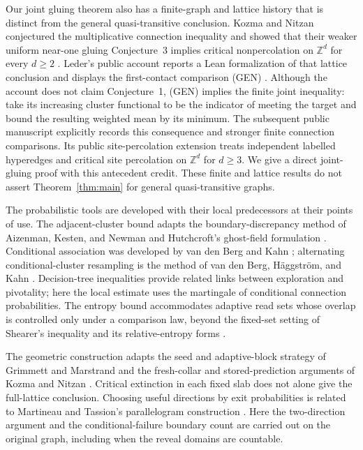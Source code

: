 \documentclass[11pt]{article}
\theoremstyle{definition}
\newcommand{\Z}{\mathbb Z}
\begin{document}
Our joint gluing theorem also has a finite-graph and lattice history
that is distinct from the general quasi-transitive conclusion.
Kozma and Nitzan conjectured the multiplicative connection inequality
\cite[Conjecture~1]{KozmaNitzan2024} and showed that their weaker
uniform near-one gluing Conjecture~3 implies critical nonpercolation
on $\Z^d$ for every $d\ge2$ \cite[Theorem~6]{KozmaNitzan2024}.
Leder's public account reports a Lean formalization of that lattice
conclusion and displays the first-contact comparison (GEN)
\cite[Section~3.4]{Leder2026}. Although the account does not claim
Conjecture~1, (GEN) implies the finite joint inequality: take its
increasing cluster functional to be the indicator of meeting the
target and bound the resulting weighted mean by its minimum.
The subsequent public manuscript \cite{ConnectionInequalities2026}
explicitly records this consequence and stronger finite connection
comparisons. Its public site-percolation extension
\cite{SiteCriticality2026} treats independent labelled hyperedges
and critical site percolation on $\Z^d$ for $d\ge3$. We give a direct
joint-gluing proof with this antecedent credit. These finite and
lattice results do not assert Theorem~\ref{thm:main} for general
quasi-transitive graphs.

The probabilistic tools are developed with their local predecessors
at their points of use. The adjacent-cluster bound adapts the
boundary-discrepancy method of Aizenman, Kesten, and Newman
\cite[Section~3]{AizenmanKestenNewman1987} and Hutchcroft's
ghost-field formulation \cite[Section~3]{Hutchcroft2020Locality}.
Conditional association was developed by van den Berg and Kahn
\cite{VanDenBergKahn2001}; alternating conditional-cluster resampling
is the method of van den Berg, H\"aggstr\"om, and Kahn
\cite{VanDenBergHaggstromKahn2006}. Decision-tree inequalities
\cite{OSSS2005,DuminilCopinRaoufiTassion2019} provide related links
between exploration and pivotality; here the local estimate uses
the martingale of conditional connection probabilities. The entropy
bound accommodates adaptive read sets whose overlap is controlled
only under a comparison law, beyond the fixed-set setting of
Shearer's inequality and its relative-entropy forms
\cite{ChungGrahamFranklShearer1986,MadimanTetali2010}.

The geometric construction adapts the seed and adaptive-block
strategy of Grimmett and Marstrand \cite{GrimmettMarstrand1990}
and the fresh-collar and stored-prediction arguments of Kozma and
Nitzan \cite[Lemma~10 and proof of Theorem~6]{KozmaNitzan2024}.
Critical extinction in each fixed slab
\cite{DuminilCopinSidoraviciusTassion2016Slabs} does not alone give
the full-lattice conclusion. Choosing useful directions by exit
probabilities is related to Martineau and Tassion's parallelogram
construction \cite{MartineauTassion2017}. Here the two-direction
argument and the conditional-failure boundary count are carried out
on the original graph, including when the reveal domains are countable.
\end{document}
